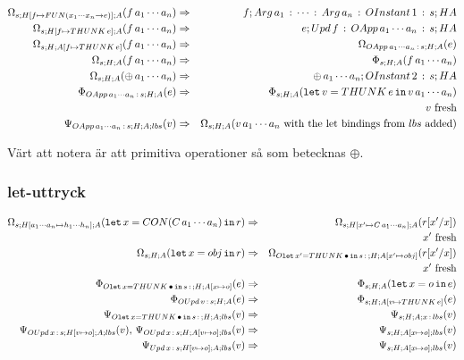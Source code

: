 \documentclass[../Optimise]{subfiles}
\begin{document}
\begin{align*}
\Omega_{s;H[f\mapsto FUN(x_{1}\cdots x_{n}\to e)];A}(f\, a_{1}\cdots a_{n}) & \Rightarrow & f;Arg\,a_{1}\,:\,\cdots\,:\,Arg\,a_{n}\,:\,OInstant\,1\,:\,s;HA\\
\Omega_{s;H[f\mapsto THUNK\,e];A}(f\, a_{1}\cdots a_{n}) & \Rightarrow & e;Upd\,f\,:\,OApp\,a_{1}\cdots a_{n}\,:\,s;HA\\
\Omega_{s;H;A[f\mapsto THUNK\,e]}(f\, a_{1}\cdots a_{n}) & \Rightarrow & \Omega_{OApp\,a_{1}\cdots a_{n}\,:\,s;H;A}(e)\\
\Omega_{s;H;A}(f\, a_{1}\cdots a_{n}) & \Rightarrow & \Phi_{s;H;A}(f\, a_{1}\cdots a_{n})\\
\Omega_{s;H;A}(\oplus\, a_{1}\cdots a_{n}) & \Rightarrow & \oplus\, a_{1}\cdots a_{n};OInstant\,2\,:\,s;HA\\
\Phi_{OApp\,a_{1}\cdots a_{n}\,:\,s;H;A}(e) & \Rightarrow & \Phi_{s;H;A}(\mathtt{let}\,v=THUNK\,e\,\mathtt{in}\,v\, a_{1}\cdots a_{n})\\
 &  & v\mbox{ fresh}\\
\Psi_{OApp\,a_{1}\cdots a_{n}\,:\,s;H;A;lbs}(v) & \Rightarrow & \Omega_{s;H;A}(v\, a_{1}\cdots a_{n}\mbox{ with the let bindings from \ensuremath{lbs} added})
\end{align*}

Värt att notera är att primitiva operationer så som \miniCode{+\# *\# ==\#} betecknas $\oplus$.  

\subsubsection{let-uttryck}
\begin{align*}
\Omega_{s;H[a_{1}\cdots a_{n}\mapsto h_{1}\cdots h_{n}];A}(\mathtt{let}\,x=CON(C\, a_{1}\cdots a_{n})\,\mathtt{in}\,r) & \Rightarrow & \Omega_{s;H[x'\mapsto C\, a_{1}\cdots a_{n}];A}(r[x'/x])\\
 &  & x'\mbox{ fresh}\\
\Omega_{s;H;A}(\mathtt{let}\,x=obj\,\mathtt{in}\,r) & \Rightarrow & \Omega_{O\mathtt{let\,}x'=THUNK\,\bullet\,\mathtt{in}\,s\,:\,;H;A[x'\mapsto obj]}(r[x'/x])\\
 &  & x'\mbox{ fresh} \\
 \Phi_{O\mathtt{let\,}x=THUNK\,\bullet\,\mathtt{in}\,s\,:\,;H;A[x\mapsto o]}(e) & \Rightarrow & \Phi_{s;H;A}(\mathtt{let}\,x=o\,\mathtt{in}\,e)\\
 \Phi_{OUpd\,v\,:\,s;H;A}(e) & \Rightarrow & \Phi_{s;H;A[v\mapsto THUNK\,e]}(e) \\
\Psi_{O\mathtt{let\,}x=THUNK\,\bullet\,\mathtt{in}\,s\,:\,;H;A;lbs}(v) & \Rightarrow & \Psi_{s;H;A;x\,:\, lbs}(v) \\
\Psi_{OUpd\,x\,:\,s;H[v\mapsto o];A;lbs}(v),\,\Psi_{OUpd\,x\,:\,s;H;A[v\mapsto o];lbs}(v) & \Rightarrow & \Psi_{s;H;A[x\mapsto o];lbs}(v)\\
\Psi_{Upd\,x\,:\,s;H[v\mapsto o];A;lbs}(v) & \Rightarrow & \Psi_{s;H;A[x\mapsto o];lbs}(v) 
\end{align*}
\end{document}
